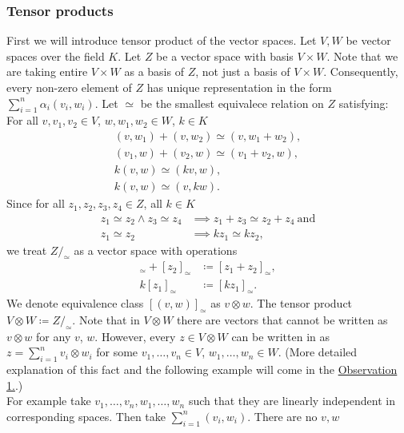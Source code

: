 \documentclass[a4paper, 12pt]{article}
\begin{document}
\subsubsection{Tensor products}
%
First we will introduce tensor product of the vector spaces. Let $V, W$ be vector spaces over the field $K$.
Let $Z$ be a vector space with basis $V \times W$. Note that we are taking entire $V \times W$ as a basis
of $Z$, not just a basis of $V \times W$. Consequently, every non-zero element of $Z$ has unique
representation in the form
$\displaystyle\sum^n_{i = 1}\alpha_i(v_i,w_i)$.
Let $\simeq$ be the smallest equivalece relation on $Z$ satisfying: \\
%
For all $v,v_1,v_2 \in V$, $w, w_1, w_2 \in W$, $k \in K$
\begin{gather*}
(v,w_1) + (v, w_2) \simeq (v, w_1 + w_2), \\
(v_1,w) +(v_2, w) \simeq (v_1+v_2,w), \\
k(v, w) \simeq (kv, w), \\
k(v, w) \simeq (v, kw).
\end{gather*}
Since for all $z_1, z_2, z_3, z_4 \in Z$, all $k \in K$
\begin{align*}
z_1 \simeq z_2 \land z_3 \simeq z_4 &\implies z_1 + z_3 \simeq z_2 + z_4 \mathrm{\ and} \\
z_1 \simeq z_2 &\implies kz_1 \simeq kz_2,
\end{align*}
%
we treat $Z/_\simeq$ as a vector space with operations
%
\begin{align*}
[z_1]_\simeq + [z_2]_\simeq &\coloneqq [z_1 + z_2]_\simeq, \\
k[z_1]_\simeq &\coloneqq [kz_1]_\simeq.
\end{align*}
%
We denote equivalence class $[(v,w)]_\simeq$ as $v \otimes w$.
The tensor product $V \otimes W \coloneqq Z/_\simeq$.
Note that in $V \otimes W$ there are vectors that cannot be written as $v \otimes w$ for any $v$, $w$.
However, every $z \in V \otimes W$ can be written in as $z =\displaystyle\sum^n_{i = 1}v_i \otimes w_i$
for some $v_1, \dots, v_n \in V$, $w_1, \dots, w_n \in W$.
(More detailed explanation of this fact and the following example will come in the
\hyperref[observation:1]{Observation 1.}.)\\
For example take $v_1,\dots, v_n, w_1, \dots, w_n$ such that they are linearly independent
in corresponding spaces.
Then take $\displaystyle\sum^n_{i=1}(v_i,w_i)$. There are no $v, w$
\end{document}
